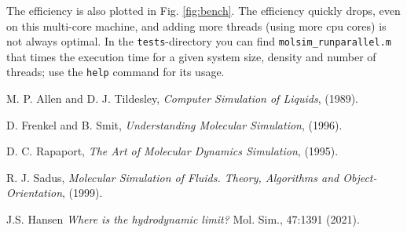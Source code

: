 \documentclass[11pt]{article}
\begin{document}
The efficiency is also plotted in Fig. \ref{fig:bench}. The efficiency quickly
drops, even on this multi-core machine, and adding more threads (using more cpu
cores) is not always optimal. In the \verb!tests!-directory you can find
\verb!molsim_runparallel.m! that times the execution time for a given system
size, density and number of threads; use the \verb!help! command for its usage.

\begin{thebibliography}{9}

  M. P. Allen and D. J. Tildesley, \emph{Computer Simulation of Liquids}, (1989). 

  D. Frenkel and B. Smit, \emph{Understanding Molecular Simulation}, (1996).

 D. C. Rapaport, \emph{The Art of Molecular Dynamics Simulation}, (1995).

  R. J. Sadus, \emph{Molecular Simulation of Fluids. Theory, Algorithms and
    Object-Orientation}, (1999).

  J.S. Hansen \emph{Where is the hydrodynamic limit?} Mol. Sim., 47:1391 (2021).
\end{thebibliography}

\appendix

\clearpage
\end{document}
